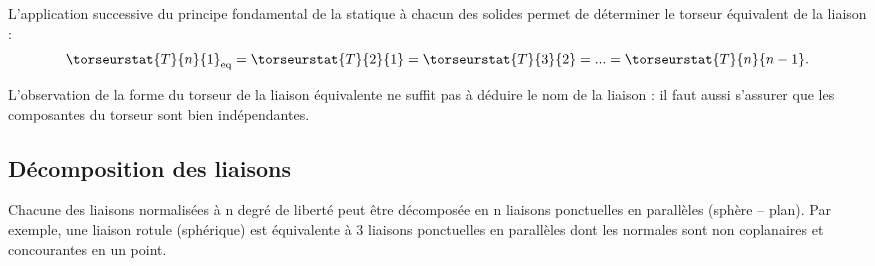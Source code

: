 \begin{rem}
L'application successive du principe fondamental de la statique à chacun des solides permet de déterminer le torseur équivalent de la liaison : 
$$
\torseurstat{T}{n}{1}_{\text{eq}} = 
\torseurstat{T}{2}{1} = 
\torseurstat{T}{3}{2} =
...
=\torseurstat{T}{n}{n-1}.
$$ 
\end{rem}

\begin{warn}
L'observation de la forme du torseur de la liaison équivalente ne suffit pas à déduire le nom de la liaison : il faut aussi s'assurer que les composantes du torseur sont bien indépendantes. 
\end{warn}

\subsection{Décomposition des liaisons}
Chacune des liaisons normalisées à n degré de liberté peut être décomposée en n liaisons ponctuelles en parallèles (sphère -- plan). Par exemple, une liaison rotule (sphérique) est équivalente à 3 liaisons ponctuelles en parallèles dont les normales sont non coplanaires et concourantes en un point.